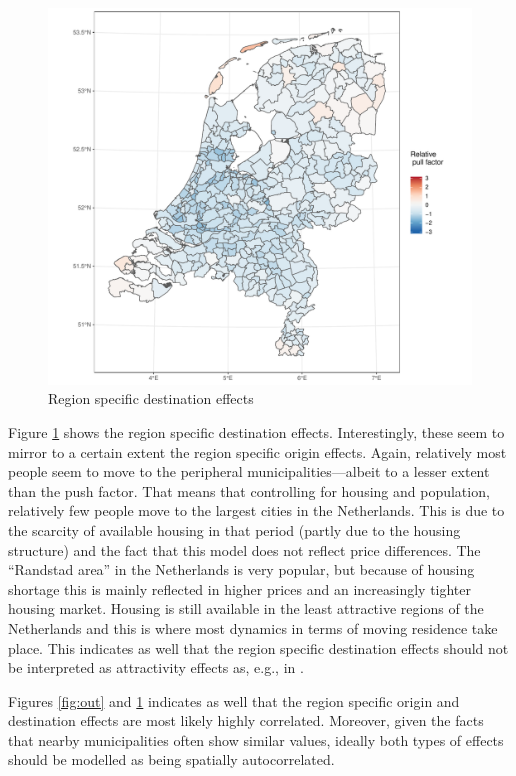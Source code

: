 \documentclass[fleqn,10pt]{SelfArx} %
\begin{document}
{{\begin{figure}[h!]
	\centering
	\includegraphics[width = \columnwidth]{../fig/p_coef_in.pdf}
	\caption{Region specific destination effects}\label{fig:in}
\end{figure}

Figure \ref{fig:in} shows the region specific destination effects. Interestingly, these seem to mirror to a certain extent the region specific origin effects. Again, relatively most people seem to move to the peripheral municipalities---albeit to a lesser extent than the push factor. That means that controlling for housing and population, relatively few people move to the largest cities in the Netherlands. This is due to the scarcity of available housing in that period (partly due to the housing structure) and the fact that this model does not reflect price differences. The ``Randstad area'' in the Netherlands is very popular, but because of housing shortage this is mainly reflected in higher prices and an increasingly tighter housing market. Housing is still available in the least attractive regions of the Netherlands and this is where most dynamics in terms of moving residence take place. This indicates as well that the region specific destination effects should not be interpreted as attractivity effects as, e.g., in \citet{congdon2010random}.

Figures \ref{fig:out} and \ref{fig:in} indicates as well that the region specific origin and destination effects are most likely highly correlated. Moreover, given the facts that nearby municipalities often show similar values, ideally both types of effects should be modelled as being spatially autocorrelated. 

}}
\end{document}
